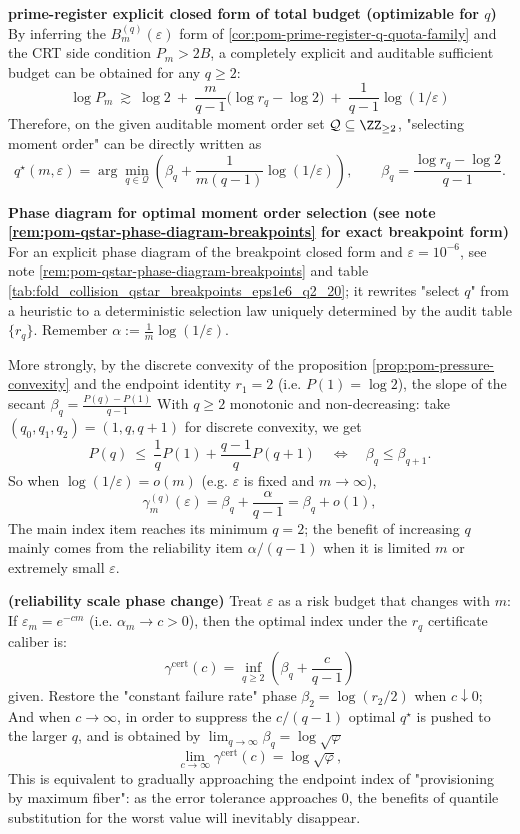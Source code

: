 \medskip\noindent\textbf{prime-register explicit closed form of total budget (optimizable for \(q\))}
By inferring the \(B_m^{(q)}(\varepsilon)\) form of \ref{cor:pom-prime-register-q-quota-family} and the CRT side condition \(P_m>2B\), a completely explicit and auditable sufficient budget can be obtained for any \(q\ge 2\):
\[
\boxed{\;
\log P_m\ \gtrsim\ \log 2\ +\ \frac{m}{q-1}\bigl(\log r_q-\log 2\bigr)\ +\ \frac{1}{q-1}\log(1/\varepsilon)\;}
\]
Therefore, on the given auditable moment order set \(\mathcal{Q}\subseteq\ZZ_{\ge 2}\), "selecting moment order" can be directly written as
\[
q^\star(m,\varepsilon)=\arg\min_{q\in\mathcal{Q}}\left(\beta_q+\frac{1}{m(q-1)}\log(1/\varepsilon)\right),
\qquad
\beta_q=\frac{\log r_q-\log 2}{q-1}.
\]

\medskip\noindent\textbf{Phase diagram for optimal moment order selection (see note \ref{rem:pom-qstar-phase-diagram-breakpoints} for exact breakpoint form)}
For an explicit phase diagram of the breakpoint closed form and \(\varepsilon=10^{-6}\), see note \ref{rem:pom-qstar-phase-diagram-breakpoints} and table \ref{tab:fold_collision_qstar_breakpoints_eps1e6_q2_20}; it rewrites "select \(q\)" from a heuristic to a deterministic selection law uniquely determined by the audit table \(\{r_q\}\).
Remember \(\alpha:=\frac{1}{m}\log(1/\varepsilon)\).

More strongly, by the discrete convexity of the proposition \ref{prop:pom-pressure-convexity} and the endpoint identity \(r_1=2\) (i.e. \(P(1)=\log 2\)), the slope of the secant
\(
\beta_q=\frac{P(q)-P(1)}{q-1}
\)
With \(q\ge 2\) monotonic and non-decreasing: take \((q_0,q_1,q_2)=(1,q,q+1)\) for discrete convexity, we get
\[
P(q)\ \le\ \frac{1}{q}P(1)+\frac{q-1}{q}P(q+1)
\quad\Longleftrightarrow\quad
\beta_q\le \beta_{q+1}.
\]
So when \(\log(1/\varepsilon)=o(m)\) (e.g. \(\varepsilon\) is fixed and \(m\to\infty\)),
\[
\gamma_m^{(q)}(\varepsilon)=\beta_q+\frac{\alpha}{q-1}=\beta_q+o(1),
\]
The main index item reaches its minimum \(q=2\); the benefit of increasing \(q\) mainly comes from the reliability item \(\alpha/(q-1)\) when it is limited \(m\) or extremely small \(\varepsilon\).

\medskip\noindent\textbf{(reliability scale phase change)}
Treat \(\varepsilon\) as a risk budget that changes with \(m\): If \(\varepsilon_m=e^{-c m}\) (i.e. \(\alpha_m\to c>0\)), then the optimal index under the \(r_q\) certificate caliber is:
\[
\gamma^{\mathrm{cert}}(c)
=\inf_{q\ge 2}\left(\beta_q+\frac{c}{q-1}\right)
\]
given.
Restore the "constant failure rate" phase \(\beta_2=\log(r_2/2)\) when \(c\downarrow 0\);
And when \(c\to\infty\), in order to suppress the \(c/(q-1)\) optimal \(q^\star\) is pushed to the larger \(q\), and is obtained by \(\lim_{q\to\infty}\beta_q=\log\sqrt{\varphi}\)
\[
\lim_{c\to\infty}\gamma^{\mathrm{cert}}(c)=\log\sqrt{\varphi},
\]
This is equivalent to gradually approaching the endpoint index of "provisioning by maximum fiber": as the error tolerance approaches 0, the benefits of quantile substitution for the worst value will inevitably disappear.

